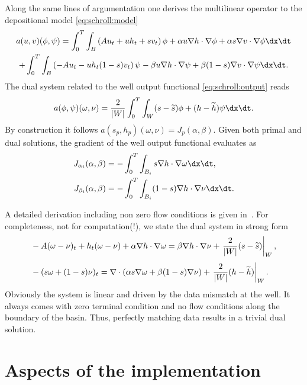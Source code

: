 Along the same lines of argumentation one derives the multilinear
operator to the depositional model \eqref{eq:schroll:model}
\begin{multline}
 a(u,v)(\phi,\psi) =
 \int_0^T \int_B \left(Au_t+uh_t+sv_t\right)\phi + \alpha u \nabla h \cdot \nabla \phi
   + \alpha s \nabla v \cdot \nabla \phi \dx \dt
\\
 + \int_0^T \int_B \left(-Au_t-uh_t(1-s)v_t\right)\psi -\beta u \nabla h \cdot \nabla \psi
   + \beta (1-s) \nabla v \cdot \nabla \psi \dx \dt.
\end{multline}
The dual system related to the well output functional \eqref{eq:schroll:output} reads
\begin{equation}
 a(\phi,\psi)(\omega,\nu) =
  \frac{2}{|W|} \int_0^T \int_W (s - \widetilde s) \phi + (h - \widetilde h) \psi \dx \dt
  .
\end{equation}
By construction it follows $a(s_p,h_p)(\omega,\nu) = J_p(\alpha,\beta)$.
Given both primal and dual solutions, the gradient of the well output functional evaluates as
\begin{align}
 J_{\alpha_i}(\alpha,\beta)
  &=
 - \int_0^T \int_{B_i} s \nabla h \cdot \nabla \omega \dx \dt,
\\
 J_{\beta_i}(\alpha,\beta) &=
 - \int_0^T \int_{B_i} (1-s) \nabla h \cdot \nabla \nu \dx \dt
 .
\end{align}

A detailed derivation including non zero flow conditions is given
in~\citet{Schroll2008}.  For completeness, not for computation(!), we
state the dual system in strong form
\begin{eqnarray}
 & \displaystyle -A(\omega-\nu)_t + h_t(\omega-\nu) + \alpha \nabla h \cdot \nabla \omega
 = \beta \nabla h \cdot \nabla \nu + \left. \frac{2}{|W|} (s - \widetilde s) \right|_W, \\[\jot]
 & \displaystyle -(s\omega + (1-s)\nu)_t
 = \nabla \cdot (\alpha s \nabla \omega + \beta (1-s) \nabla \nu) + \left. \frac{2}{|W|} (h - \widetilde h) \right|_W .
\end{eqnarray}
Obviously the system is linear and driven by the data mismatch at the
well.  It always comes with zero terminal condition and no flow
conditions along the boundary of the basin.  Thus, perfectly matching
data results in a trivial dual solution.

\section{Aspects of the implementation}


